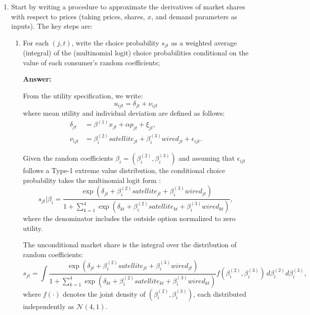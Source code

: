 \documentclass[english,11pt]{article}
\begin{document}
\begin{enumerate}
\begin{enumerate}
\item Start by writing a procedure to approximate the derivatives of market
shares with respect to prices (taking prices, shares, $x$, and demand
parameters as inputs). The key steps are:
\begin{enumerate}
\item For each $(j,t)$, write the choice probability $s_{jt}$ as a weighted
average (integral) of the (multinomial logit) choice probabilities
conditional on the value of each consumer's random coefficients; 

\textbf{Answer:}

From the utility specification, we write:
\begin{equation*}
u_{ijt} = \delta_{jt} + \nu_{ijt}
\end{equation*}
where mean utility and individual deviation are defined as follows:
\begin{align*}
\delta_{jt} &= \beta^{(1)}x_{jt} + \alpha p_{jt} + \xi_{jt}, \\
\nu_{ijt} &= \beta_i^{(2)}satellite_{jt} + \beta_i^{(3)}wired_{jt} + \epsilon_{ijt}.
\end{align*}

Given the random coefficients $\beta_i = (\beta_i^{(2)}, \beta_i^{(3)})$ and assuming that $\epsilon_{ijt}$ follows a Type-1 extreme value distribution, the conditional choice probability takes the multinomial logit form \citep{berry1995automobile}:
\begin{equation*}
s_{jt}|\beta_i = 
\frac{\exp(\delta_{jt} + \beta_i^{(2)}satellite_{jt} + \beta_i^{(3)}wired_{jt})}
{1 + \sum_{k=1}^4 \exp(\delta_{kt} + \beta_i^{(2)}satellite_{kt} + \beta_i^{(3)}wired_{kt})},
\end{equation*}
where the denominator includes the outside option normalized to zero utility.

The unconditional market share is the integral over the distribution of random coefficients:
\begin{equation*}
s_{jt} = 
\int 
\frac{\exp(\delta_{jt} + \beta_i^{(2)}satellite_{jt} + \beta_i^{(3)}wired_{jt})}
{1 + \sum_{k=1}^4 \exp(\delta_{kt} + \beta_i^{(2)}satellite_{kt} + \beta_i^{(3)}wired_{kt})}
f(\beta_i^{(2)}, \beta_i^{(3)}) \, d\beta_i^{(2)} d\beta_i^{(3)},
\end{equation*}
where $f(\cdot)$ denotes the joint density of $(\beta_i^{(2)}, \beta_i^{(3)})$, each distributed independently as $\mathcal{N}(4,1)$.



\end{enumerate}
\end{enumerate}
\end{enumerate}
\end{document}

